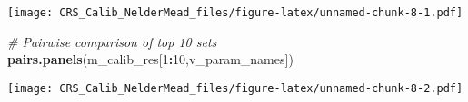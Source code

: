 \documentclass[
]{article}
\newenvironment{Shaded}{\begin{snugshade}}{\end{snugshade}}
\newcommand{\CommentTok}[1]{\textcolor[rgb]{0.56,0.35,0.01}{\textit{#1}}}
\newcommand{\DataTypeTok}[1]{\textcolor[rgb]{0.13,0.29,0.53}{#1}}
\newcommand{\DecValTok}[1]{\textcolor[rgb]{0.00,0.00,0.81}{#1}}
\newcommand{\KeywordTok}[1]{\textcolor[rgb]{0.13,0.29,0.53}{\textbf{#1}}}
\newcommand{\NormalTok}[1]{#1}
\newcommand{\OperatorTok}[1]{\textcolor[rgb]{0.81,0.36,0.00}{\textbf{#1}}}
\begin{document}
\begin{Shaded}
\end{Shaded}

\texttt{[image: CRS\_Calib\_NelderMead\_files/figure-latex/unnamed-chunk-8-1.pdf]}

\begin{Shaded}
\begin{Highlighting}[]
\CommentTok{# Pairwise comparison of top 10 sets}
\KeywordTok{pairs.panels}\NormalTok{(m_calib_res[}\DecValTok{1}\OperatorTok{:}\DecValTok{10}\NormalTok{,v_param_names])}
\end{Highlighting}
\end{Shaded}

\texttt{[image: CRS\_Calib\_NelderMead\_files/figure-latex/unnamed-chunk-8-2.pdf]}
\end{document}
